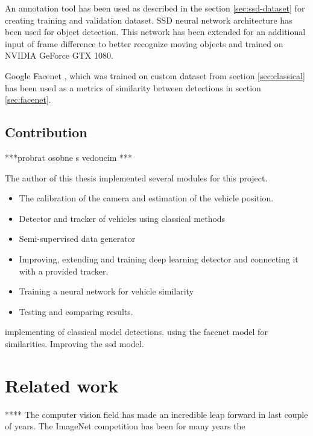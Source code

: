 \documentclass[a4paper,12pt,titlepage, twoside]{article}
\numberwithin{figure}{section}
\begin{document}
An annotation tool has been used as described in the section \ref{sec:ssd-dataset} for creating training and validation dataset. SSD\cite{ssd} neural network architecture has been used for object detection. This network has been extended for an additional input of frame difference to better recognize moving objects and trained on 
NVIDIA GeForce GTX 1080.

Google Facenet \cite{facenet}, which was trained on custom dataset from section \ref{sec:classical} has been used as a metrics of similarity between detections in section \ref{sec:facenet}. 


\subsection{Contribution}

***probrat osobne s vedoucim ***

The author of this thesis implemented several modules for this project.

\begin{itemize}
\item The calibration of the camera and estimation of the vehicle position.

\item Detector and tracker of vehicles using classical methods

\item Semi-supervised data generator

\item Improving, extending and training deep learning detector and connecting it with a provided tracker.

\item Training a neural network for vehicle similarity

\item Testing and comparing results.


\end{itemize}

implementing of classical model detections.
using the facenet model for similarities.
Improving the ssd model.

\section{Related work}
****
The computer vision field has made an incredible leap forward in last couple of years. The ImageNet \cite{deng2009imagenet} competition has been for many years the 
\end{document}
